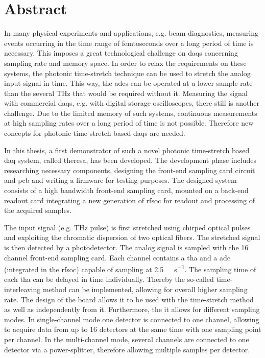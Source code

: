 \chapter*{Abstract}
In many physical experiments and applications, e.g. beam diagnostics, measuring events occurring in the time range of femtoseconds over a long period of time is necessary. 
This imposes a great technological challenge on \glspl{daq} concerning sampling rate and memory space.
In order to relax the requirements on these systems, the photonic time-stretch technique can be used to stretch the analog input signal in time.
This way, the \glspl{adc} can be operated at a lower sample rate than the several \si{\THz} that would be required without it. 
Measuring the signal with commercial \glspl{daq}, e.g. with digital storage oscilloscopes, there still is another challenge.
Due to the limited memory of such systems, continuous measurements at high sampling rates over a long period of time is not possible.
Therefore new concepts for photonic time-stretch based \glspl{daq} are needed.

In this thesis, a first demonstrator of such a novel photonic time-stretch based \gls{daq} system, called \gls{theresa}, has been developed.
The development phase includes researching necessary components, designing the front-end sampling card circuit and \gls{pcb} and writing a firmware for testing purposes.
The designed system consists of a high bandwidth front-end sampling card, mounted on a back-end readout card integrating a new generation of \gls{rfsoc} for readout and processing of the acquired samples.

The input signal (e.g. \si{\tera \hertz} pulse) is first stretched using chirped optical pulses and exploiting the chromatic dispersion of two optical fibers.
The stretched signal is then detected by a photodetector.
The analog signal is sampled with the 16 channel front-end sampling card.
Each channel contains a \gls{tha} and a \gls{adc} (integrated in the \gls{rfsoc}) capable of sampling at \SI{2.5}{\giga \sample \per \second}.
The sampling time of each \gls{tha} can be delayed in time individually. 
Thereby the so-called time-interleaving method can be implemented, allowing for overall higher sampling rate.
The design of the board allows it to be used with the time-stretch method as well as independently from it.
Furthermore, the it allows for different sampling modes.
In single-channel mode one detector is connected to one channel, allowing to acquire data from up to 16 detectors at the same time with one sampling point per channel.
In the multi-channel mode, several channels are connected to one detector via a power-splitter, therefore allowing multiple samples per detector.

